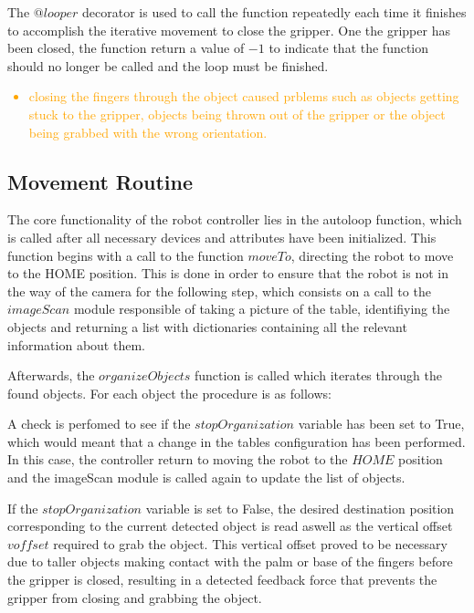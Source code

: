 The \(@looper\) decorator is used to call the function repeatedly each time it finishes to accomplish the iterative movement to close the gripper. One the gripper has been closed, the function return a value of \(-1\) to indicate that the function should no longer be called and the loop must be finished.


\textcolor{orange}{
\begin{itemize}
    \item closing the fingers through the object caused prblems such as objects getting stuck to the gripper, objects being thrown out of the gripper or the object being grabbed with the wrong orientation.
\end{itemize}  
} %


\subsection{Movement Routine}

The core functionality of the robot controller lies in the autoloop function, which is called after all necessary devices and attributes have been initialized. This function begins with a call to the function \(moveTo\), directing the robot to move to the HOME position.  This is done in order to ensure that the robot is not in the way of the camera for the following step, which consists on a call to the \(imageScan\) module responsible of taking a picture of the table, identifiying the objects and returning a list with dictionaries containing all the relevant information about them.

Afterwards, the \(organizeObjects\) function is called which iterates through the found objects. For each object the procedure is as follows: 

A check is perfomed to see if the \(stopOrganization\) variable has been set to True, which would meant that a change in the tables configuration has been performed. In this case, the controller return to moving the robot to the \(HOME\) position and the imageScan module is called again to update the list of objects. 

If the \(stopOrganization\) variable is set to False, the desired destination position corresponding to the current detected object is read aswell as the vertical offset \(voffset\) required to grab the object. This vertical offset proved to be necessary due to taller objects making contact with the palm or base of the fingers before the gripper is closed, resulting in a detected feedback force that prevents the gripper from closing and grabbing the object. 

